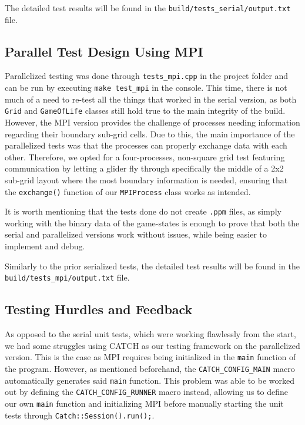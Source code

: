 \documentclass[11pt]{article}
\begin{document}
The detailed test results will be found in the \texttt{build/tests\_serial/output.txt} file.

\subsection{Parallel Test Design Using MPI}
Parallelized testing was done through \texttt{tests\_mpi.cpp} in the project folder and can be run by executing \texttt{make test\_mpi} in the console. This time, there is not much of a need to re-test all the things that worked in the serial version, as both \texttt{Grid} and \texttt{GameOfLife} classes still hold true to the main integrity of the build. However, the MPI version provides the challenge of processes needing information regarding their boundary sub-grid cells. Due to this, the main importance of the parallelized tests was that the processes can properly exchange data with each other. Therefore, we opted for a four-processes, non-square grid test featuring communication by letting a glider fly through specifically the middle of a 2x2 sub-grid layout where the most boundary information is needed, ensuring that the \texttt{exchange()} function of our \texttt{MPIProcess} class works as intended. 

It is worth mentioning that the tests done do not create \texttt{.ppm} files, as simply working with the binary data of the game-states is enough to prove that both the serial and parallelized versions work without issues, while being easier to implement and debug.

Similarly to the prior serialized tests, the detailed test results will be found in the \\\texttt{build/tests\_mpi/output.txt} file.

\subsection{Testing Hurdles and Feedback}
As opposed to the serial unit tests, which were working flawlessly from the start, we had some struggles using CATCH as our testing framework on the parallelized version. This is the case as MPI requires being initialized in the \texttt{main} function of the program. However, as mentioned beforehand, the \texttt{CATCH\_CONFIG\_MAIN} macro automatically generates said \texttt{main} function. This problem was able to be worked out by defining the \texttt{CATCH\_CONFIG\_RUNNER} macro instead, allowing us to define our own \texttt{main} function and initializing MPI before manually starting the unit tests through \texttt{Catch::Session().run();}.
\end{document}
